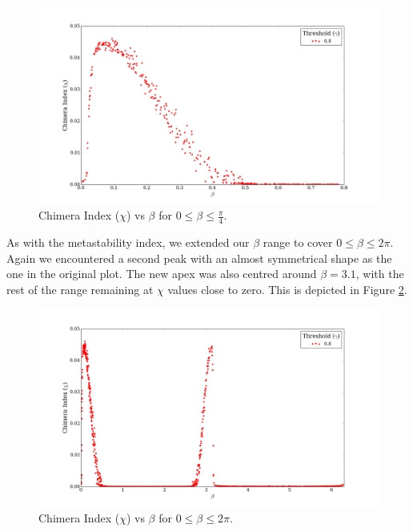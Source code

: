 \documentclass[a4paper,11pt]{article}
\begin{document}
\begin{figure}[H]
\begin{center}
\includegraphics[scale = 0.35]{figures/chi_vs_beta_orig}
\end{center}
\caption{
	Chimera Index ($\chi$) vs $\beta$ for $0 \leq \beta \leq \frac{\pi}{4}$.
	\label{fig:chi-vs-beta-orig}
}
\end{figure}

As with the metastability index, we extended our $\beta$ range to cover $0 \leq \beta \leq 2\pi$. Again we encountered a second peak with an almost symmetrical shape as the one in the original plot. The new apex was also centred around $\beta = 3.1$, with the rest of the range remaining at $\chi$ values close to zero. This is depicted in Figure \ref{fig:chi-vs-beta-ext}.

\begin{figure}[H]
\begin{center}
\includegraphics[scale = 0.35]{figures/chi_vs_beta_ext}
\caption{
	Chimera Index ($\chi$) vs $\beta$ for $0 \leq \beta \leq 2\pi$.
	\label{fig:chi-vs-beta-ext}
}
\end{center}
\end{figure}
\end{document}
